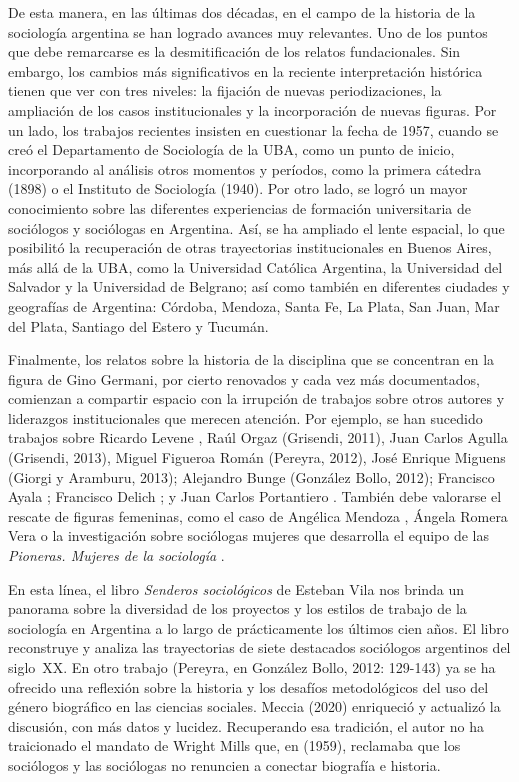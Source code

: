 De esta manera, en las últimas dos décadas, en el campo de la historia de la sociología argentina se han logrado avances muy relevantes. Uno de los puntos que debe remarcarse es la desmitificación de los relatos fundacionales. Sin embargo, los cambios más significativos en la reciente interpretación histórica tienen que ver con tres niveles: la fijación de nuevas periodizaciones, la ampliación de los casos institucionales y la incorporación de nuevas figuras. Por un lado, los trabajos recientes insisten en cuestionar la fecha de 1957, cuando se creó el Departamento de Sociología de la UBA, como un punto de inicio, incorporando al análisis otros momentos y períodos, como la primera cátedra (1898) o el Instituto de Sociología (1940). Por otro lado, se logró un mayor conocimiento sobre las diferentes experiencias de formación universitaria de sociólogos y sociólogas en Argentina. Así, se ha ampliado el lente espacial, lo que posibilitó la recuperación de otras trayectorias institucionales en Buenos Aires, más allá de la UBA, como la Universidad Católica Argentina, la Universidad del Salvador y la Universidad de Belgrano; así como también en diferentes ciudades y geografías de Argentina: Córdoba, Mendoza, Santa Fe, La Plata, San Juan, Mar del Plata, Santiago del Estero y Tucumán.

Finalmente, los relatos sobre la historia de la disciplina que se concentran en la figura de Gino Germani, por cierto renovados y cada vez más documentados, comienzan a compartir espacio con la irrupción de trabajos sobre otros autores y liderazgos institucionales que merecen atención. Por ejemplo, se han sucedido trabajos sobre Ricardo Levene \parencite{1530-RAJMANOVICH2016}, Raúl Orgaz \parencite{1528-REQUENA2010}(Grisendi, 2011), Juan Carlos Agulla (Grisendi, 2013), Miguel Figueroa Román (Pereyra, 2012), José Enrique Miguens (Giorgi y Aramburu, 2013); Alejandro Bunge (González Bollo, 2012); Francisco Ayala \parencite{1619-ESCOBAR2011}; Francisco Delich \parencite{1580-CASCO2018}; y Juan Carlos Portantiero \parencite{1581-CASCO2019,1582-CASCO2020}. También debe valorarse el rescate de figuras femeninas, como el caso de Angélica Mendoza \parencite{1623-FICCARDI2022}, Ángela Romera Vera \parencite{1620-ESCOBAR2016} o la investigación sobre sociólogas mujeres que desarrolla el equipo de las \emph{Pioneras. Mujeres de la sociología} \parencite{1564-BLANCO2019}.

En esta línea, el libro \emph{Senderos sociológicos} de Esteban Vila nos brinda un panorama sobre la diversidad de los proyectos y los estilos de trabajo de la sociología en Argentina a lo largo de prácticamente los últimos cien años. El libro reconstruye y analiza las trayectorias de siete destacados sociólogos argentinos del siglo~XX. En otro trabajo (Pereyra, en González Bollo, 2012: 129-143) ya se ha ofrecido una reflexión sobre la historia y los desafíos metodológicos del uso del género biográfico en las ciencias sociales. Meccia (2020) enriqueció y actualizó la discusión, con más datos y lucidez. Recuperando esa tradición, el autor no ha traicionado el mandato de Wright Mills que, en  (1959), reclamaba que los sociólogos y las sociólogas no renuncien a conectar biografía e historia.

